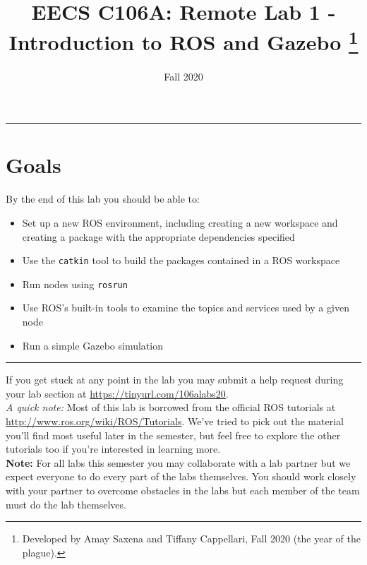 \documentclass{article}
\begin{document}
\title{EECS C106A: Remote Lab 1 - Introduction to ROS and Gazebo \footnote{Developed by Amay Saxena and Tiffany Cappellari, Fall 2020 (the year of the plague).}}
\author{}
\date{Fall 2020}
\maketitle
\vspace{-0.1in}

\noindent\rule{\columnwidth}{0.5pt}
\vspace{-0.15in}
\section*{Goals}
By the end of this lab you should be able to:
\begin{itemize}
\item Set up a new ROS environment, including creating a new workspace and creating a package with the appropriate dependencies specified
\item Use the \verb=catkin= tool to build the packages contained in a ROS workspace
\item Run nodes using \verb=rosrun=
\item Use ROS's built-in tools to examine the topics and services used by a given node
\item Run a simple Gazebo simulation
\end{itemize}

\noindent\rule{\columnwidth}{0.5pt}
\vspace{0.15in}

If you get stuck at any point in the lab you may submit a help request during your lab section at \url{https://tinyurl.com/106alabs20}.\\

\emph{A quick note:} Most of this lab is borrowed from the official ROS tutorials at \url{http://www.ros.org/wiki/ROS/Tutorials}. We've tried to pick out the material you'll find most useful later in the semester, but feel free to explore the other tutorials too if you're interested in learning more.\\

\textbf{Note:} For all labs this semester you may collaborate with a lab partner but we expect everyone to do every part of the labs themselves. You should work closely with your partner to overcome obstacles in the labs but each member of the team must do the lab themselves.

\tableofcontents
\end{document}
